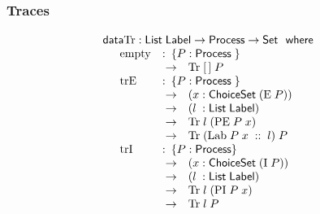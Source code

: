 \documentclass{beamer}
\newcommand{\ar}{\rightarrow}
\newcommand{\datarm}{\mathsf{data}}
\newcommand{\wheresf}{\mathsf{where}}
\newcommand{\Set}{\mathsf{Set}}
\newcommand{\Process}{\mathsf{Process}}
\newcommand{\List}{\mathsf{List}}
\newcommand{\ChoiceSet}{\mathsf{ChoiceSet}}
\newcommand{\Label}{\mathsf{Label}}
\newcommand{\emptyC}{\mathrm{empty}}
\newcommand{\extChoice}{\mathrm{trE}}
\newcommand{\intChoice}{\mathrm{trI}}
\newcommand{\Tr}{\mathrm{Tr}}
\newcommand{\pii}{\mathrm{PI}}
\newcommand{\pe}{\mathrm{PE}}
\newcommand{\ii}{\mathrm{I}}
\newcommand{\e}{\mathrm{E}}
\newcommand{\lab}{\mathrm{Lab}}
\begin{document}
%
%
%


\begin{frame}
\frametitle{Traces}

\[\begin{array}[t]{@{}lcl} 
\datarm \Tr  : \List\;\Label \ar \Process  \ar \Set \ \  \wheresf \\
\mbox{\quad} \begin{array}[t]{lc@{}ll@{\;}c@{\;}l}
\emptyC &:& \multicolumn{4}{l}{\{ P : \Process \; \}} \\
&&\ar &\multicolumn{3}{l}{ \Tr \; [\,] \; P }\\
\extChoice  &:&\multicolumn{4}{l}{ \{ P : \Process \; \}} \\
&&\ar&  (x &:& \ChoiceSet\; (\e \; P )) \\
&&\ar &(l &:& \List\;\Label) \\
&&\ar &\multicolumn{3}{l}{\Tr \; l \; (\pe\; P \; x)} \\
&&\ar &\multicolumn{3}{l}{\Tr\; (\lab\; P\; x\; ::\; l)\; P}\\
\intChoice &:& \multicolumn{4}{l}{ \{ P : \Process  \}} \\
&& \ar  &(x &:& \ChoiceSet\; (\ii  \; P)) \\
&& \ar &(l &:& \List\;\Label)\\
&& \ar &\multicolumn{3}{l}{\Tr \; l \; (\pii\; P\; x) }\\
&& \ar &\multicolumn{3}{l}{\Tr\;l \; P} 
\end{array} 
\end{array} \]

\end{frame}
\end{document}
